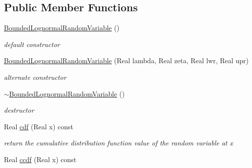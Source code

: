 \subsection*{Public Member Functions}
\begin{DoxyCompactItemize}
\item 
\hyperlink{classPecos_1_1BoundedLognormalRandomVariable_a474166c30b501daa45b7b752fb4918b5}{Bounded\+Lognormal\+Random\+Variable} ()\label{classPecos_1_1BoundedLognormalRandomVariable_a474166c30b501daa45b7b752fb4918b5}

\begin{DoxyCompactList}\small\item\em default constructor \end{DoxyCompactList}\item 
\hyperlink{classPecos_1_1BoundedLognormalRandomVariable_af72e9e277a3430a2c33f131bdfb0e23c}{Bounded\+Lognormal\+Random\+Variable} (Real lambda, Real zeta, Real lwr, Real upr)\label{classPecos_1_1BoundedLognormalRandomVariable_af72e9e277a3430a2c33f131bdfb0e23c}

\begin{DoxyCompactList}\small\item\em alternate constructor \end{DoxyCompactList}\item 
\hyperlink{classPecos_1_1BoundedLognormalRandomVariable_a807f5f719688a9656c0fdaec5ae3341b}{$\sim$\+Bounded\+Lognormal\+Random\+Variable} ()\label{classPecos_1_1BoundedLognormalRandomVariable_a807f5f719688a9656c0fdaec5ae3341b}

\begin{DoxyCompactList}\small\item\em destructor \end{DoxyCompactList}\item 
Real \hyperlink{classPecos_1_1BoundedLognormalRandomVariable_addd564e7f4f314e12d38df74d845f0d8}{cdf} (Real x) const \label{classPecos_1_1BoundedLognormalRandomVariable_addd564e7f4f314e12d38df74d845f0d8}

\begin{DoxyCompactList}\small\item\em return the cumulative distribution function value of the random variable at x \end{DoxyCompactList}\item 
Real \hyperlink{classPecos_1_1BoundedLognormalRandomVariable_a23c3b599e7e4788a9a5e9e93c3dbaf4d}{ccdf} (Real x) const \label{classPecos_1_1BoundedLognormalRandomVariable_a23c3b599e7e4788a9a5e9e93c3dbaf4d}


\end{DoxyCompactItemize}
